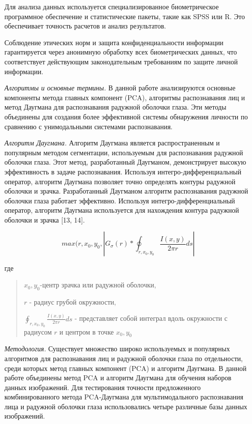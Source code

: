 Для анализа данных используется специализированное биометрическое
программное обеспечение и статистические пакеты, такие как SPSS или R.
Это обеспечивает точность расчетов и анализ результатов.

Соблюдение этических норм и защита конфиденциальности информации
гарантируется через анонимную обработку всех биометрических данных, что
соответствует действующим законодательным требованиям по защите личной
информации.

\emph{Алгоритмы и основные термины.} В данной работе анализируются
основные компоненты метода главных компонент (PCA), алгоритмы
распознавания лиц и метод Даугмана для распознавания радужной оболочки
глаза. Эти методы объединены для создания более эффективной системы
обнаружения личности по сравнению с унимодальными системами
распознавания.

\emph{Алгоритм Даугмана.} Алгоритм Даугмана является распространенным и
популярным методом сегментации, используемым для распознавания радужной
оболочки глаза. Этот метод, разработанный Даугманом, демонстрирует
высокую эффективность в задаче распознавания. Используя
интегро-дифференциальный оператор, алгоритм Даугмана позволяет точно
определять контуры радужной оболочки и зрачка. Разработанный Даугманом
алгоритм распознавания радужной оболочки глаза работает эффективно.
Используя интегро-дифференциальный оператор, алгоритм Даугмана
используется для нахождения контура радужной оболочки и зрачка {[}13,
14{]}.

\[max(r,x_{0},y_{0},\left| G_{\sigma}(r)*\oint_{r,x_{0},y_{0}}\frac{I(x,y)}{2\pi r}ds \right|\]

где

\begin{quote}
\(x_{0},y_{0}\)-центр зрачка или радужной оболочки,

\(r\) - радиус грубой окружности,

\(\oint_{r,x_{0},y_{0}}\frac{I(x,y)}{2\pi r}ds\) - представляет собой
интеграл вдоль окружности с радиусом \(r\) и центром в точке
\(x_{0},y_{0}\)
\end{quote}

\emph{Методология.} Существует множество широко используемых и
популярных алгоритмов для распознавания лиц и радужной оболочки глаза по
отдельности, среди которых метод главных компонент (PCA) и алгоритм
Даугмана. В данной работе объединены метод PCA и алгоритм Даугмана для
обучения наборов данных изображений. Для тестирования точности
предложенного комбинированного метода PCA-Даугмана для мультимодального
распознавания лица и радужной оболочки глаза использовались четыре
различные базы данных изображений.

